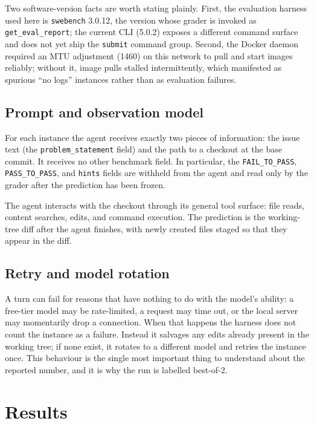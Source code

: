 \documentclass[11pt,a4paper]{article}
\begin{document}
Two software-version facts are worth stating plainly. First, the evaluation harness
used here is \texttt{swebench} 3.0.12, the version whose grader is invoked as
\texttt{get\_eval\_report}; the current CLI (5.0.2) exposes a different command surface
and does not yet ship the \texttt{submit} command group. Second, the Docker daemon
required an MTU adjustment (1460) on this network to pull and start images reliably;
without it, image pulls stalled intermittently, which manifested as spurious ``no logs''
instances rather than as evaluation failures.

\subsection{Prompt and observation model}

For each instance the agent receives exactly two pieces of information: the issue text
(the \texttt{problem\_statement} field) and the path to a checkout at the base commit.
It receives no other benchmark field. In particular, the \texttt{FAIL\_TO\_PASS},
\texttt{PASS\_TO\_PASS}, and \texttt{hints} fields are withheld from the agent and read
only by the grader after the prediction has been frozen.

The agent interacts with the checkout through its general tool surface: file reads,
content searches, edits, and command execution. The prediction is the working-tree diff
after the agent finishes, with newly created files staged so that they appear in the
diff.

\subsection{Retry and model rotation}

A turn can fail for reasons that have nothing to do with the model's ability: a
free-tier model may be rate-limited, a request may time out, or the local server may
momentarily drop a connection. When that happens the harness does not count the instance
as a failure. Instead it salvages any edits already present in the working tree; if none
exist, it rotates to a different model and retries the instance once. This behaviour is
the single most important thing to understand about the reported number, and it is why
the run is labelled best-of-2.

\section{Results}
\label{sec:results}
\end{document}
